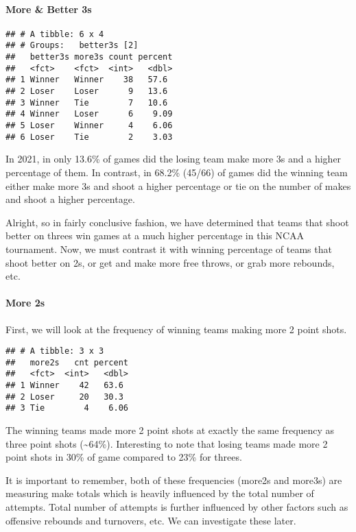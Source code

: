 \documentclass[
]{article}
\begin{document}
\hypertarget{more-better-3s}{%
\paragraph{More \& Better 3s}\label{more-better-3s}}

\begin{verbatim}
## # A tibble: 6 x 4
## # Groups:   better3s [2]
##   better3s more3s count percent
##   <fct>    <fct>  <int>   <dbl>
## 1 Winner   Winner    38   57.6 
## 2 Loser    Loser      9   13.6 
## 3 Winner   Tie        7   10.6 
## 4 Winner   Loser      6    9.09
## 5 Loser    Winner     4    6.06
## 6 Loser    Tie        2    3.03
\end{verbatim}

In 2021, in only 13.6\% of games did the losing team make more 3s and a
higher percentage of them. In contrast, in 68.2\% (45/66) of games did
the winning team either make more 3s and shoot a higher percentage or
tie on the number of makes and shoot a higher percentage.

Alright, so in fairly conclusive fashion, we have determined that teams
that shoot better on threes win games at a much higher percentage in
this NCAA tournament. Now, we must contrast it with winning percentage
of teams that shoot better on 2s, or get and make more free throws, or
grab more rebounds, etc.

\hypertarget{more-2s}{%
\paragraph{More 2s}\label{more-2s}}

First, we will look at the frequency of winning teams making more 2
point shots.

\begin{verbatim}
## # A tibble: 3 x 3
##   more2s   cnt percent
##   <fct>  <int>   <dbl>
## 1 Winner    42   63.6 
## 2 Loser     20   30.3 
## 3 Tie        4    6.06
\end{verbatim}

The winning teams made more 2 point shots at exactly the same frequency
as three point shots (\textasciitilde64\%). Interesting to note that
losing teams made more 2 point shots in 30\% of game compared to 23\%
for threes.

It is important to remember, both of these frequencies (more2s and
more3s) are measuring make totals which is heavily influenced by the
total number of attempts. Total number of attempts is further influenced
by other factors such as offensive rebounds and turnovers, etc. We can
investigate these later.
\end{document}
